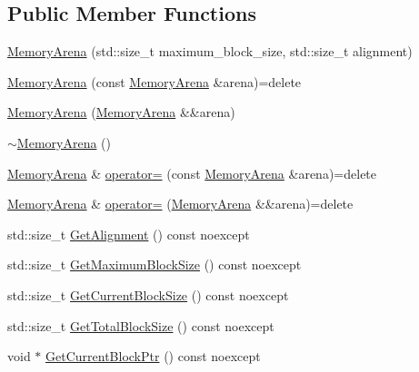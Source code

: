 \subsection*{Public Member Functions}
\begin{DoxyCompactItemize}
\item 
\mbox{\hyperlink{classmage_1_1_memory_arena_a28b6f4bf491f03b8c5ba8c987c4a4af0}{Memory\+Arena}} (std\+::size\+\_\+t maximum\+\_\+block\+\_\+size, std\+::size\+\_\+t alignment)
\item 
\mbox{\hyperlink{classmage_1_1_memory_arena_a1eca6fdacbd1226f4b21f443d118168b}{Memory\+Arena}} (const \mbox{\hyperlink{classmage_1_1_memory_arena}{Memory\+Arena}} \&arena)=delete
\item 
\mbox{\hyperlink{classmage_1_1_memory_arena_a98829c5a87ba028c376f100cca09e876}{Memory\+Arena}} (\mbox{\hyperlink{classmage_1_1_memory_arena}{Memory\+Arena}} \&\&arena)
\item 
\mbox{\hyperlink{classmage_1_1_memory_arena_acfee6fc205e2eaf6aeef4acf19948e6e}{$\sim$\+Memory\+Arena}} ()
\item 
\mbox{\hyperlink{classmage_1_1_memory_arena}{Memory\+Arena}} \& \mbox{\hyperlink{classmage_1_1_memory_arena_a7e7799f859c55435714933972ecb8b95}{operator=}} (const \mbox{\hyperlink{classmage_1_1_memory_arena}{Memory\+Arena}} \&arena)=delete
\item 
\mbox{\hyperlink{classmage_1_1_memory_arena}{Memory\+Arena}} \& \mbox{\hyperlink{classmage_1_1_memory_arena_aa4b80a917a838a1ca3788f906723d273}{operator=}} (\mbox{\hyperlink{classmage_1_1_memory_arena}{Memory\+Arena}} \&\&arena)=delete
\item 
std\+::size\+\_\+t \mbox{\hyperlink{classmage_1_1_memory_arena_a665df710e6620978805a3603eaf36b86}{Get\+Alignment}} () const noexcept
\item 
std\+::size\+\_\+t \mbox{\hyperlink{classmage_1_1_memory_arena_adecbc8148c10c1d50bc2639a44a59fa2}{Get\+Maximum\+Block\+Size}} () const noexcept
\item 
std\+::size\+\_\+t \mbox{\hyperlink{classmage_1_1_memory_arena_a39be42ace3dfb2afab288926e2e0bca6}{Get\+Current\+Block\+Size}} () const noexcept
\item 
std\+::size\+\_\+t \mbox{\hyperlink{classmage_1_1_memory_arena_a0a5d4de92cb900d8e190eba28deed2dc}{Get\+Total\+Block\+Size}} () const noexcept
\item 
void $\ast$ \mbox{\hyperlink{classmage_1_1_memory_arena_a7bdbc9da32c1f8d49ce5d2f153870284}{Get\+Current\+Block\+Ptr}} () const noexcept
\item 

\end{DoxyCompactItemize}
